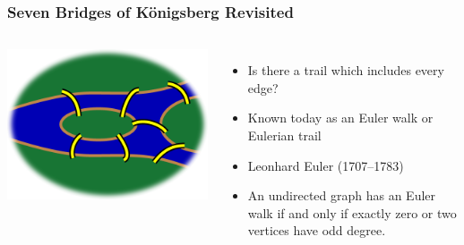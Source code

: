 \documentclass{beamer}
\theoremstyle{Plain}\newtheorem{kt}{Kuratowski's Theorem}
\theoremstyle{Definition}\newtheorem{te}{Tr\'emaux Exploration}
\theoremstyle{Definition}\newtheorem{dfs}{Depth-First Search}
\begin{document}
\begin{frame}
  \frametitle{Seven Bridges of K\"onigsberg Revisited}
  \begin{columns}
    \begin{center}
    \includegraphics[width=\textwidth]{images/7bridges.png}
    \newline
    \newline
    \end{center}
  \pause
    \begin{itemize}
      \item Is there a trail which includes every edge?
      \item Known today as an Euler walk or Eulerian trail
      \item Leonhard Euler (1707--1783)
        \pause
      \item An undirected graph has an Euler walk if and only if exactly zero or two vertices have odd degree.
    \end{itemize}
  \end{columns}
\end{frame}


\end{document}
